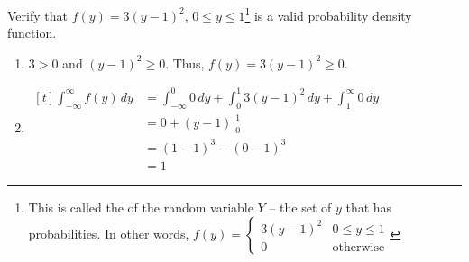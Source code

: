 \begin{example}
    Verify that $f(y) = 3(y - 1)^2$, $0 \le y \le 1$\footnote{This is called the  of the random variable $Y$ -- the set of $y$ that has  probabilities. In other words, $f(y) = \begin{cases} 3(y - 1)^2 & 0 \le y \le 1 \\ 0 & \text{otherwise} \end{cases}$} is a valid probability density function. 

    \begin{enumerate}
        \item $3 > 0$ and $(y - 1)^2 \ge 0$. Thus, $f(y) = 3(y - 1)^2 \ge 0$. 
        \item $\begin{aligned}[t]
            \int_{-\infty}^\infty f(y) \,dy 
             & = \int_{-\infty}^0 0 \,dy + \int_0^1 3(y - 1)^2 \,dy + \int_1^\infty 0 \,dy \\
             & = 0 + (y - 1) \bigg|_0^1 \\
             & = (1 - 1)^3 - (0 - 1)^3 \\
             & = 1
        \end{aligned}$
    \end{enumerate}
\end{example}

